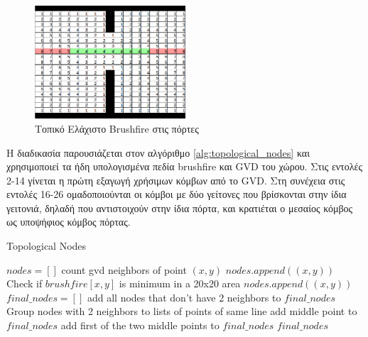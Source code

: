 \begin{figure}[!htb]
    \centering
    \includegraphics[width=0.5\textwidth]{./images/chapter5/brushfire_gvd_example.png}
    \caption{Τοπικό Ελάχιστο Brushfire στις πόρτες}
    \label{fig:brushfire_minimum_example}
\end{figure}


Η διαδικασία παρουσιάζεται στον αλγόριθμο \ref{alg:topological_nodes} και χρησιμοποιεί τα ήδη υπολογισμένα πεδία brushfire και GVD του χώρου. Στις εντολές 2-14 γίνεται η πρώτη εξαγωγή χρήσιμων κόμβων από το GVD. Στη συνέχεια στις εντολές 16-26 ομαδοποιούνται οι κόμβοι με δύο γείτονες που βρίσκονται στην ίδια γειτονιά, δηλαδή που αντιστοιχούν στην ίδια πόρτα, και κρατιέται ο μεσαίος κόμβος ως υποψήφιος κόμβος πόρτας.



\begin{algorithm}[!htb]
\caption{Topological Nodes}
\label{alg:topological_nodes}
\begin{algorithmic}[1]
        \State $nodes = []$
            \State count gvd neighbors of point $(x,y)$
                \State $nodes.append((x,y))$
            \EndIf
                \State Check if $brushfire[x,y]$ is minimum in a 20x20 area
                    \State $nodes.append((x,y))$
                \EndIf
            \EndIf
        \EndFor
        \State {}
        \State $final\_nodes = []$
        \State add all nodes that don't have 2 neighbors to $final\_nodes$
        \State Group nodes with 2 neighbors to lists of points of same line
                \State add middle point to $final\_nodes$
            \Else
                \State add first of the two middle points to $final\_nodes$
            \EndIf
        \EndFor
        \State \Return $final\_nodes$
\end{algorithmic}
\end{algorithm}


